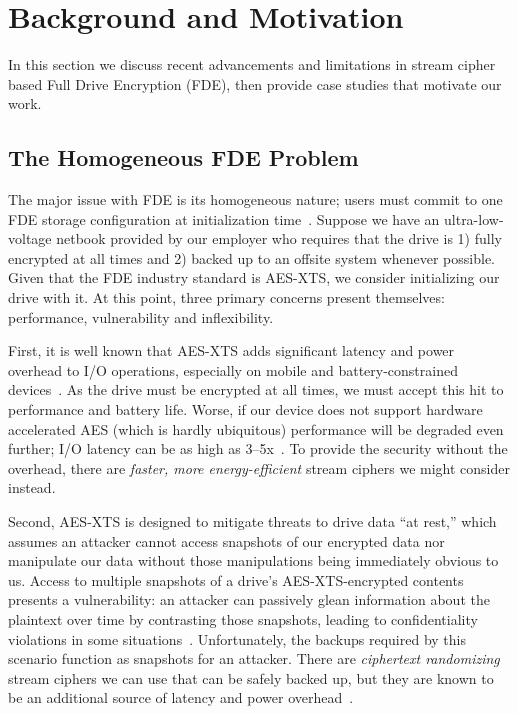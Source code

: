 \section{Background and Motivation}\label{sec:motivation}

In this section we discuss recent advancements and limitations in stream cipher
based Full Drive Encryption (FDE), then provide \numCases case studies that
motivate our work.


\subsection{The Homogeneous FDE Problem}

The major issue with FDE is its homogeneous nature; users must commit to one FDE
storage configuration at initialization time~\cite{dmcrypt}. Suppose we have an
ultra-low-voltage netbook provided by our employer who requires that the drive
is 1) fully encrypted at all times and 2) backed up to an offsite system
whenever possible. Given that the FDE industry standard is AES-XTS, we consider
initializing our drive with it. At this point, three primary concerns present
themselves: performance, vulnerability and inflexibility.

First, it is well known that AES-XTS adds significant latency and power overhead
to I/O operations, especially on mobile and battery-constrained
devices~\cite{google-engadget, android-M-mobile-motivation,
android-M-mobile-motivation-2}. As the drive must be encrypted at all times, we
must accept this hit to performance and battery life. Worse, if our device does
not support hardware accelerated AES (which is hardly ubiquitous) performance
will be degraded even further; I/O latency can be as high as
3--5x~\cite{StrongBox}. To provide the security without the overhead, there are
{\em faster, more energy-efficient} stream ciphers we might consider instead.

Second, AES-XTS is designed to mitigate threats to drive data ``at rest,'' which
assumes an attacker cannot access snapshots of our encrypted data nor manipulate
our data without those manipulations being immediately obvious to us. Access to
multiple snapshots of a drive's AES-XTS-encrypted contents presents a
vulnerability: an attacker can passively glean information about the plaintext
over time by contrasting those snapshots, leading to confidentiality violations
in some situations~\cite{XEX, XTS}. Unfortunately, the backups required by this
scenario function as snapshots for an attacker. There are {\em ciphertext
randomizing} stream ciphers we can use that can be safely backed up, but they
are known to be an additional source of latency and power
overhead~\cite{Freestyle}.

